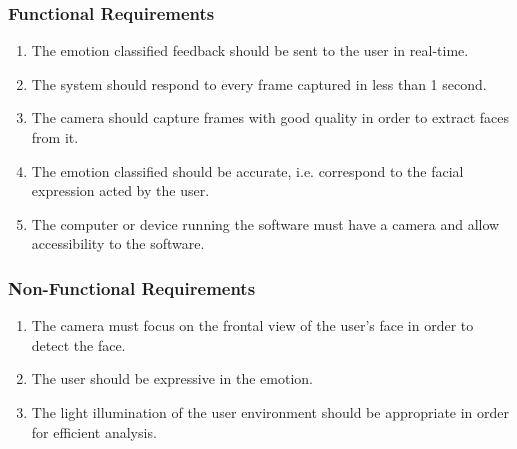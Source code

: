 \documentclass[master]{thesis-uestc}
\begin{document}
\subsubsection{Functional Requirements}
\begin{enumerate}
    \item The emotion classified feedback should be sent to the user in real-time.
    \item The system should respond to every frame captured in less than 1 second.
    \item The camera should capture frames with good quality in order to extract faces from it.
    \item The emotion classified should be accurate, i.e. correspond to the facial expression acted by the user.
    \item The computer or device running the software must have a camera and allow accessibility to the software.
\end{enumerate}
\subsubsection{Non-Functional Requirements}
\begin{enumerate}
    \item The camera must focus on the frontal view of the user's face in order to detect the face.
    \item The user should be expressive in the emotion.
    \item The light illumination of the user environment should be appropriate in order for efficient analysis.
\end{enumerate}
\end{document}
